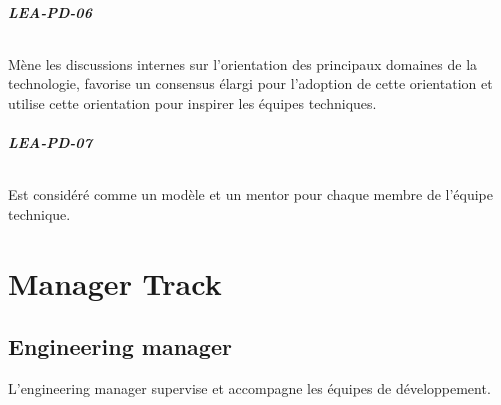 \documentclass[a4paper, french, openany, 12pt]{book}
\newcommand\cha[1]{\textcolor{OliveGreen}{\textbf{\uppercase{lea-{#1}}}}}
\begin{document}
\begin{multicols}{2}
  \paragraph*{\cha{pd-06}}

  Mène les discussions internes sur l'orientation des principaux domaines de la technologie, favorise un consensus élargi
  pour l'adoption de cette orientation et utilise cette orientation pour inspirer les équipes techniques.
  
  \paragraph*{\cha{pd-07}}

  Est considéré comme un modèle et un mentor pour chaque membre de l'équipe technique.

\end{multicols}

\part{Manager Track}

\chapter{Engineering manager}

L'engineering manager supervise et accompagne les équipes de développement.
\end{document}
